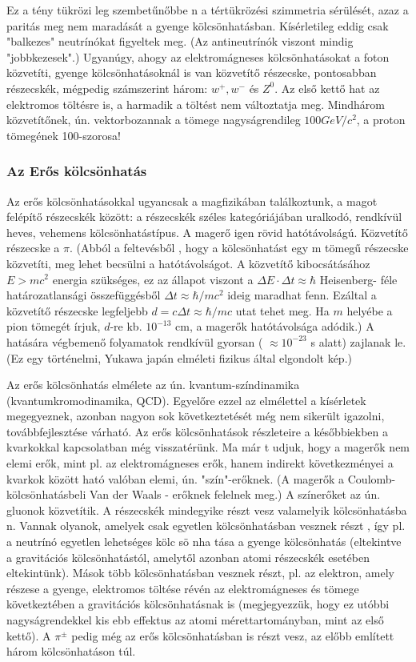 \documentclass[../main.tex]{subfiles}
\begin{document}
Ez a tény tükrözi leg szembetűnőbbe n a tértükrözési szimmetria sérülését,
azaz a paritás meg nem maradását a gyenge kölcsönhatásban. Kísérletileg
eddig csak "balkezes" neutrínókat figyeltek meg. (Az antineutrínók viszont
mindig "jobbkezesek".) Ugyanúgy, ahogy az elektromágneses kölcsönhatásokat a foton közvetíti, gyenge kölcsönhatásoknál is van közvetítő részecske,
pontosabban részecskék, mégpedig számszerint három: $w^+, w^- $ és $Z^0$. Az
első kettő hat az elektromos töltésre is, a harmadik a töltést nem változtatja
meg. Mindhárom közvetítőnek, ún. vektorbozannak a tömege nagyságrendileg $100 GeV/c^2$, a proton tömegének 100-szorosa!

\subsubsection*{Az Erős kölcsönhatás}
Az erős kölcsönhatásokkal ugyancsak a magfizikában találkoztunk, a magot felépítő részecskék között: a részecskék széles kategóriájában uralkodó,
rendkívül heves, vehemens kölcsönhatástípus. A magerő igen rövid hatótávolságú. Közvetítő részecske a $\pi$. (Abból a feltevésből , hogy a kölcsönhatást egy m tömegű részecske közvetíti,
meg lehet becsülni a hatótávolságot. A közvetítő kibocsátásához $E > mc^2$ energia szükséges, ez az állapot viszont a $\Delta E \cdot \Delta t \approx \hbar$ Heisenberg- féle határozatlansági összefüggésből
$\Delta t \approx \hbar/mc^2$ ideig maradhat fenn. Ezáltal a közvetítő részecske legfeljebb
$d = c \Delta t \approx \hbar/mc$ utat tehet meg. Ha $m$ helyébe a pion tömegét írjuk, $d$-re kb. $10^{-13}$ cm, a magerők hatótávolsága adódik.) A hatására végbemenő
folyamatok rendkívül gyorsan ( $\approx 10^{-23}$ s alatt) zajlanak le. (Ez egy történelmi, Yukawa japán elméleti fizikus által elgondolt kép.)

Az erős kölcsönhatás elmélete az ún. kvantum-színdinamika (kvantumkromodinamika, QCD). Egyelőre ezzel az elmélettel a kísérletek megegyeznek, azonban nagyon sok következtetését még nem sikerült igazolni,
továbbfejlesztése várható. Az erős kölcsönhatások részleteire a későbbiekben a kvarkokkal kapcsolatban még visszatérünk. Ma már t udjuk, hogy a magerők
nem elemi erők, mint pl. az elektromágneses erők, hanem indirekt következményei a kvarkok között ható valóban elemi, ún. "szín"-erőknek. (A magerők a Coulomb-kölcsönhatásbeli Van der Waals - erőknek
felelnek meg.) A színerőket az ún. gluonok közvetítik. A részecskék mindegyike részt vesz valamelyik kölcsönhatásba n. Vannak olyanok, amelyek csak
egyetlen kölcsönhatásban vesznek részt , így pl. a neutrínó egyetlen lehetséges kölc sö nha tása a gyenge kölcsönhatás (eltekintve a gravitációs kölcsönhatástól,
amelytől azonban atomi részecskék esetében eltekintünk). Mások több kölcsönhatásban vesznek részt, pl. az elektron, amely részese a gyenge,
elektromos töltése révén az elektromágneses és tömege következtében a gravitációs kölcsönhatásnak is (megjegyezzük, hogy ez utóbbi nagyságrendekkel kis ebb effektus az atomi mérettartományban, mint az első kettő).
A $\pi^\pm$ pedig még az erős kölcsönhatásban is részt vesz, az előbb említett három kölcsönhatáson túl.
\end{document}

